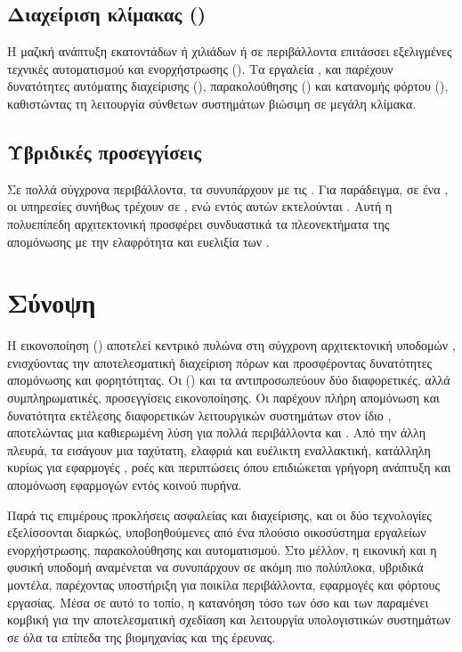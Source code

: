 \subsection{Διαχείριση κλίμακας ()}

Η μαζική ανάπτυξη εκατοντάδων ή χιλιάδων  ή  σε περιβάλλοντα  επιτάσσει εξελιγμένες τεχνικές αυτοματισμού και ενορχήστρωσης (). Τα εργαλεία ,  και  παρέχουν δυνατότητες αυτόματης διαχείρισης (), παρακολούθησης () και κατανομής φόρτου (), καθιστώντας τη λειτουργία σύνθετων συστημάτων βιώσιμη σε μεγάλη κλίμακα.

\subsection{Υβριδικές προσεγγίσεις}

Σε πολλά σύγχρονα περιβάλλοντα, τα  συνυπάρχουν με τις . Για παράδειγμα, σε ένα , οι υπηρεσίες συνήθως τρέχουν σε , ενώ εντός αυτών εκτελούνται . Αυτή η πολυεπίπεδη αρχιτεκτονική προσφέρει συνδυαστικά τα πλεονεκτήματα της απομόνωσης  με την ελαφρότητα και ευελιξία των .

\section{Σύνοψη}

Η εικονοποίηση () αποτελεί κεντρικό πυλώνα στη σύγχρονη αρχιτεκτονική υποδομών , ενισχύοντας την αποτελεσματική διαχείριση πόρων και προσφέροντας δυνατότητες απομόνωσης και φορητότητας. Οι  () και τα  αντιπροσωπεύουν δύο διαφορετικές, αλλά συμπληρωματικές, προσεγγίσεις εικονοποίησης. Οι  παρέχουν πλήρη απομόνωση και δυνατότητα εκτέλεσης διαφορετικών λειτουργικών συστημάτων στον ίδιο , αποτελώντας μια καθιερωμένη λύση για πολλά περιβάλλοντα  και . Από την άλλη πλευρά, τα  εισάγουν μια ταχύτατη, ελαφριά και ευέλικτη εναλλακτική, κατάλληλη κυρίως για εφαρμογές ,  ροές και περιπτώσεις όπου επιδιώκεται γρήγορη ανάπτυξη και απομόνωση εφαρμογών εντός κοινού πυρήνα.

Παρά τις επιμέρους προκλήσεις ασφαλείας και διαχείρισης, και οι δύο τεχνολογίες εξελίσσονται διαρκώς, υποβοηθούμενες από ένα πλούσιο οικοσύστημα εργαλείων ενορχήστρωσης, παρακολούθησης και αυτοματισμού. Στο μέλλον, η εικονική και η φυσική υποδομή αναμένεται να συνυπάρχουν σε ακόμη πιο πολύπλοκα, υβριδικά μοντέλα, παρέχοντας υποστήριξη για ποικίλα περιβάλλοντα, εφαρμογές και φόρτους εργασίας. Μέσα σε αυτό το τοπίο, η κατανόηση τόσο των  όσο και των  παραμένει κομβική για την αποτελεσματική σχεδίαση και λειτουργία υπολογιστικών συστημάτων σε όλα τα επίπεδα της βιομηχανίας και της έρευνας.